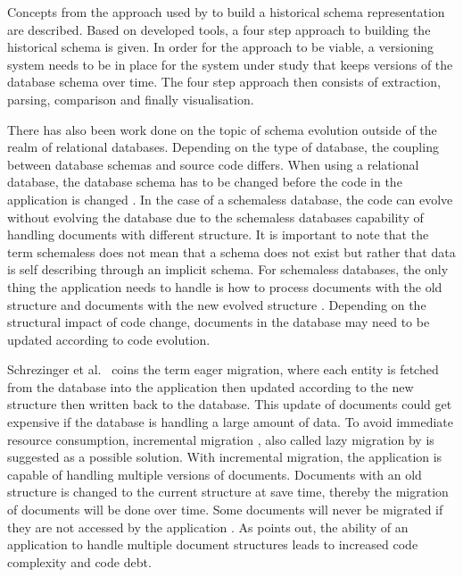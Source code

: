 Concepts from the approach used by \cite{Oscar} to build a historical schema representation are described. Based on developed tools, a four step approach to building the historical schema is given. In order for the approach to be viable, a versioning system needs to be in place for the system under study that keeps versions of the database schema over time. The four step approach then consists of extraction, parsing, comparison and finally visualisation.

There has also been work done on the topic of schema evolution outside of the realm of relational databases. Depending on the type of database, the coupling between database schemas and source code differs. When using a relational database, the database schema has to be changed before the code in the application is changed \cite{NoSQLDistilled}. In the case of a schemaless database, the code can evolve without evolving the database due to the schemaless databases capability of handling documents with different structure. It is important to note that the term schemaless does not mean that a schema does not exist but rather that data is self describing through an implicit schema. For schemaless databases, the only thing the application needs to handle is how to process documents with the old structure and documents with the new evolved structure \cite{NoSQLDistilled}. Depending on the structural impact of code change, documents in the database may need to be updated according to code evolution. 

Schrezinger et al.\ \cite{EvolutionNoSQL} coins the term eager migration, where each entity is fetched from the database into the application then updated according to the new structure then written back to the database. This update of documents could get expensive if the database is handling a large amount of data. To avoid immediate resource consumption, incremental migration \cite{NoSQLDistilled}, also called lazy migration by \cite{EvolutionNoSQL} is suggested as a possible solution. With incremental migration, the application is capable of handling multiple versions of documents. Documents with an old structure is changed to the current structure at save time, thereby the migration of documents will be done over time. Some documents will never be migrated if they are not accessed by the application \cite{EvolutionNoSQL}. As \cite{EvolutionNoSQL} points out, the ability of an application to handle multiple document structures leads to increased code complexity and code debt.





